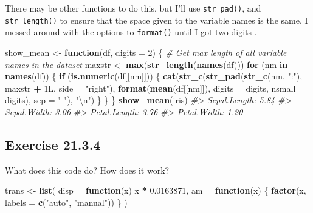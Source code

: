 \documentclass[]{book}
\newenvironment{Shaded}{\begin{snugshade}}{\end{snugshade}}
\newcommand{\CharTok}[1]{\textcolor[rgb]{0.31,0.60,0.02}{#1}}
\newcommand{\CommentTok}[1]{\textcolor[rgb]{0.56,0.35,0.01}{\textit{#1}}}
\newcommand{\ControlFlowTok}[1]{\textcolor[rgb]{0.13,0.29,0.53}{\textbf{#1}}}
\newcommand{\DataTypeTok}[1]{\textcolor[rgb]{0.13,0.29,0.53}{#1}}
\newcommand{\DecValTok}[1]{\textcolor[rgb]{0.00,0.00,0.81}{#1}}
\newcommand{\FloatTok}[1]{\textcolor[rgb]{0.00,0.00,0.81}{#1}}
\newcommand{\KeywordTok}[1]{\textcolor[rgb]{0.13,0.29,0.53}{\textbf{#1}}}
\newcommand{\NormalTok}[1]{#1}
\newcommand{\OperatorTok}[1]{\textcolor[rgb]{0.81,0.36,0.00}{\textbf{#1}}}
\newcommand{\StringTok}[1]{\textcolor[rgb]{0.31,0.60,0.02}{#1}}
\theoremstyle{plain}
\theoremstyle{remark}
\theoremstyle{definition}
\theoremstyle{definition}
\theoremstyle{definition}
\theoremstyle{remark}
\begin{document}
There may be other functions to do this, but I'll use
\texttt{str\_pad()}, and \texttt{str\_length()} to ensure that the space
given to the variable names is the same. I messed around with the
options to \texttt{format()} until I got two digits .

\begin{Shaded}
\begin{Highlighting}[]
\NormalTok{show_mean <-}\StringTok{ }\ControlFlowTok{function}\NormalTok{(df, }\DataTypeTok{digits =} \DecValTok{2}\NormalTok{) \{}
  \CommentTok{# Get max length of all variable names in the dataset}
\NormalTok{  maxstr <-}\StringTok{ }\KeywordTok{max}\NormalTok{(}\KeywordTok{str_length}\NormalTok{(}\KeywordTok{names}\NormalTok{(df)))}
  \ControlFlowTok{for}\NormalTok{ (nm }\ControlFlowTok{in} \KeywordTok{names}\NormalTok{(df)) \{}
    \ControlFlowTok{if}\NormalTok{ (}\KeywordTok{is.numeric}\NormalTok{(df[[nm]])) \{}
      \KeywordTok{cat}\NormalTok{(}\KeywordTok{str_c}\NormalTok{(}\KeywordTok{str_pad}\NormalTok{(}\KeywordTok{str_c}\NormalTok{(nm, }\StringTok{":"}\NormalTok{), maxstr }\OperatorTok{+}\StringTok{ }\NormalTok{1L, }\DataTypeTok{side =} \StringTok{"right"}\NormalTok{),}
                \KeywordTok{format}\NormalTok{(}\KeywordTok{mean}\NormalTok{(df[[nm]]), }\DataTypeTok{digits =}\NormalTok{ digits, }\DataTypeTok{nsmall =}\NormalTok{ digits),}
                \DataTypeTok{sep =} \StringTok{" "}\NormalTok{),}
          \StringTok{"}\CharTok{\textbackslash{}n}\StringTok{"}\NormalTok{)}
\NormalTok{    \}}
\NormalTok{  \}}
\NormalTok{\}}
\KeywordTok{show_mean}\NormalTok{(iris)}
\CommentTok{#> Sepal.Length: 5.84 }
\CommentTok{#> Sepal.Width:  3.06 }
\CommentTok{#> Petal.Length: 3.76 }
\CommentTok{#> Petal.Width:  1.20}
\end{Highlighting}
\end{Shaded}

\hypertarget{exercise-21.3.4}{%
\subsection*{\texorpdfstring{Exercise
{21.3.4}}{Exercise 21.3.4}}\label{exercise-21.3.4}}

What does this code do? How does it work?

\begin{Shaded}
\begin{Highlighting}[]
\NormalTok{trans <-}\StringTok{ }\KeywordTok{list}\NormalTok{(}
  \DataTypeTok{disp =} \ControlFlowTok{function}\NormalTok{(x) x }\OperatorTok{*}\StringTok{ }\FloatTok{0.0163871}\NormalTok{,}
  \DataTypeTok{am =} \ControlFlowTok{function}\NormalTok{(x) \{}
    \KeywordTok{factor}\NormalTok{(x, }\DataTypeTok{labels =} \KeywordTok{c}\NormalTok{(}\StringTok{"auto"}\NormalTok{, }\StringTok{"manual"}\NormalTok{))}
\NormalTok{  \}}
\NormalTok{)}
\end{Highlighting}
\end{Shaded}
\end{document}
